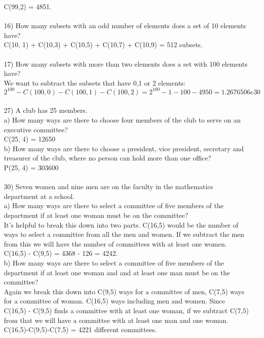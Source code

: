 \documentclass{article}
\begin{document}
\begin{flushleft}
\setlength\parindent{24pt}C(99,2) = 4851. \\
~\\
\setlength\parindent{0pt}16) How many subsets with an odd number of elements does a set of 10 elements have? \\
\setlength\parindent{24pt}C(10, 1) + C(10,3) + C(10,5) + C(10,7) + C(10,9) = 512 subsets. \\
~\\
\setlength\parindent{0pt}17) How many subsets with more than two elements does a set with 100 elements have? \\
\setlength\parindent{24pt}We want to subtract the subsets that have 0,1 or 2 elements:  $2^100 - C(100,0) - C(100,1) - C(100,2) = 2^100 - 1 - 100 - 4950 = 1.2676506e30$ \\
~\\
\setlength\parindent{0pt}27) A club has 25 members.  \\
\setlength\parindent{24pt}a) How many ways are there to choose four members of the club to serve on an executive committee? \\
\setlength\parindent{48pt} C(25, 4) = 12650 \\
\setlength\parindent{24pt}b) How many ways are there to choose a president, vice president, secretary and treasurer of the club, where no person can hold more than one office? \\
\setlength\parindent{48pt} P(25, 4) = 303600 \\
~\\
\setlength\parindent{0pt}30) Seven women and nine men are on the faculty in the mathematics department at a school. \\
\setlength\parindent{24pt}a) How many ways are there to select a committee of five members of the department if at least one woman must be on the committee?\\
\setlength\parindent{48pt} It's helpful to break this down into two parts.  C(16,5) would be the number of ways to select a committee from all the men and women.  If we subtract the men from this we will have the number of committees with at least one women.  C(16,5) - C(9,5) = 4368 - 126 = 4242.\\
\setlength\parindent{24pt}b) How many ways are there to select a committee of five members of the department if at least one woman and and at least one man must be on the committee?\\
\setlength\parindent{48pt} Again we break this down into C(9,5) ways for a committee of men, C(7,5) ways for a committee of woman.  C(16,5) ways including men and women.  Since C(16,5) - C(9,5) finds a committee with at least one woman, if we subtract C(7,5) from that we will have a committee with at least one man and one woman.  C(16,5)-C(9,5)-C(7,5) = 4221 different committees.\\

\end{flushleft}
\end{document}
